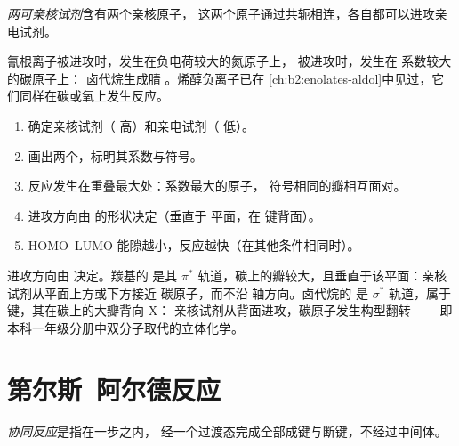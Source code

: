 \begin{definition}[两可亲核试剂]\label{def:b2:frontier-orbitals:ambident}
\emph{两可亲核试剂}含有两个亲核原子，
这两个原子通过共轭相连，各自都可以进攻亲电试剂。
\end{definition}

氰根离子被进攻时，发生在负电荷较大的氮原子上，
被进攻时，发生在  系数较大的碳原子上：
卤代烷生成腈 。烯醇负离子已在
\cref{ch:b2:enolates-aldol}中见过，它们同样在碳或氧上发生反应。

\begin{method}[前线轨道分析]\label{met:b2:frontier-orbitals:fmo}
\begin{enumerate}
  \item 确定亲核试剂（ 高）和亲电试剂（ 低）。
  \item 画出两个，标明其系数与符号。
  \item 反应发生在重叠最大处：系数最大的原子，
        符号相同的瓣相互面对。
  \item 进攻方向由  的形状决定（垂直于
         平面，在  键背面）。
  \item HOMO--LUMO 能隙越小，反应越快（在其他条件相同时）。
\end{enumerate}
\end{method}

进攻方向由  决定。羰基的  是其
$\pi^*$ 轨道，碳上的瓣较大，且垂直于该平面：亲核试剂从平面上方或下方接近
碳原子，而不沿  轴方向。卤代烷的  是
$\sigma^*$ 轨道，属于  键，其在碳上的大瓣背向 X：
亲核试剂从背面进攻，碳原子发生构型翻转
——即本科一年级分册中双分子取代的立体化学。

\section{第尔斯–阿尔德反应}

\begin{definition}[协同反应]\label{def:b2:frontier-orbitals:concerted}
\emph{协同反应}是指在一步之内，
经一个过渡态完成全部成键与断键，不经过中间体。
\end{definition}

